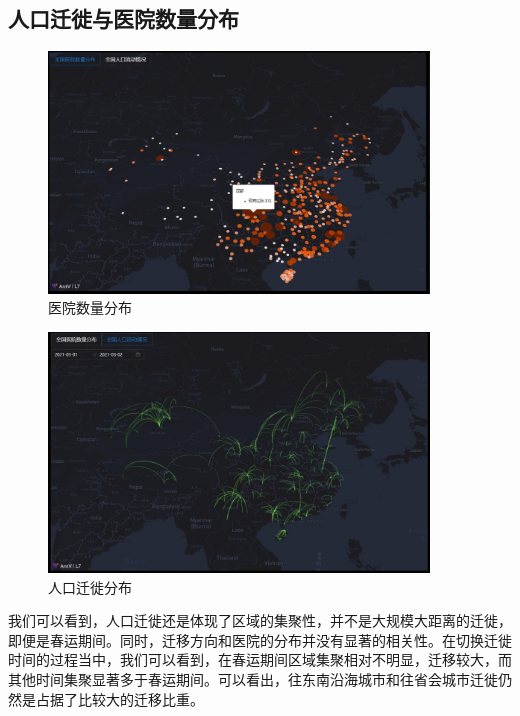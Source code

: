 \documentclass{ctexart}
\begin{document}
\subsection{人口迁徙与医院数量分布}

\begin{figure}[H]
    \centering
    \includegraphics[width=0.9\textwidth]{img/hospitalNum}
    \caption{医院数量分布}
    \label{}
\end{figure}
\begin{figure}[H]
    \centering
    \includegraphics[width=0.9\textwidth]{img/gather}
    \caption{人口迁徙分布}
    \label{}
\end{figure}
我们可以看到，人口迁徙还是体现了区域的集聚性，并不是大规模大距离的迁徙，即便是春运期间。同时，迁移方向和医院的分布并没有显著的相关性。在切换迁徙时间的过程当中，我们可以看到，在春运期间区域集聚相对不明显，迁移较大，而其他时间集聚显著多于春运期间。可以看出，往东南沿海城市和往省会城市迁徙仍然是占据了比较大的迁移比重。
\end{document}
